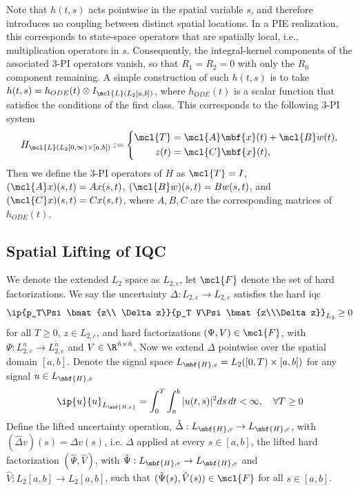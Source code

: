 \documentclass[11pt,a4paper,onecolumn]{article}
\theoremstyle{definition}
\theoremstyle{remark}
\begin{document}
Note that $h(t,s)$ acts pointwise in the spatial variable $s$, and therefore introduces no coupling between distinct spatial locations. In a PIE realization, 
this corresponds to state-space operators that are spatially local, i.e., multiplication operators in $s$. Consequently, the integral-kernel components 
of the associated 3-PI operators vanish, so that $R_1 = R_2 = 0$ with only the $R_0$ component remaining. A simple construction of such $h(t,s)$ is to take 
$h(t,s) = h_{ODE}(t)\otimes I_{\mcl{L}(L_2[a,b])}$, where $h_{ODE}(t)$ is a scalar function that satisfies the conditions of the first class. This corresponds to the following
3-PI system
\begin{equation*}
   H_{\mcl{L}(L_2[0,\infty)\times[a,b])} := \left\{ \begin{aligned}
    \mcl{T} &= \mcl{A}\mbf{x}(t) + \mcl{B}w(t), \\
    z(t) &= \mcl{C}\mbf{x}(t),
   \end{aligned} \right.
\end{equation*}
Then we define the 3-PI operators of $H$ as $\mcl{T} = I$, $(\mcl{A}x)(s,t) = Ax(s,t)$, $(\mcl{B}w)(s,t) = Bw(s,t)$, and $(\mcl{C}x)(s,t) = Cx(s,t)$, 
where $A,B,C$ are the corresponding matrices of $h_{ODE}(t)$.



\subsection{Spatial Lifting of IQC}
We denote the extended $L_2$ space as $L_{2,e}$, let $\mcl{F}$ denote the set of hard factorizations. We say the uncertainty 
$\Delta : L_{2,e} \to L_{2,e}$ satisfies the hard iqc 
\begin{equation}\label{eqn:temporal-IQC}
    \ip{p_T\Psi\bmat{z\\ \Delta z}}{p_T V\Psi\bmat{z\\\Delta z}}_{L_2}\geq 0
\end{equation}
for all $T\geq0$, $z\in L_{2,e}$, and hard factorizations $(\Psi, V) \in \mcl{F}$, with $\Psi:L^n_{2,e}\to L^{\tilde{n}}_{2,e}$ and $V\in\R^{\tilde{n}\times \tilde{n}}$.
Now we extend $\Delta$ pointwise over the spatial domain $[a,b]$. Denote the signal space
$L_{\mbf{H},e} = L_2([0,T)\times [a,b])$ for any  signal $u\in L_{\mbf{H},e}$
\begin{equation}
    \ip{u}{u}_{L_\mbf{H,e}} = \int_0^T \int_a^b |u(t,s)|^2 ds\, dt < \infty, \quad \forall T \geq 0
\end{equation}
Define the lifted uncertainty operation, $\hat{\Delta}:L_{\mbf{H},e} \to L_{\mbf{H},e}$, with $(\hat\Delta v)(s) = \Delta v(s)$, 
i.e. $\Delta$ applied at every $s\in[a,b]$, the lifted hard factorization $(\hat{\Psi}, \hat{V})$, with $\hat{\Psi}:L_{\mbf{H},e} \to L_{\mbf{H},e}$ and
$\hat{V}:L_2[a,b] \to L_2[a,b]$, such that $(\hat{\Psi}(s), \hat{V}(s))\in\mcl{F}$ for all $s\in[a,b]$.
\end{document}
